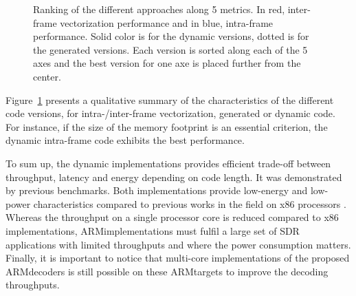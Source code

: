 \begin{figure}
  \centering
  \caption{\label{fig:eval_polar_sc_colgate}Ranking of the different approaches
    along 5 metrics. In red, inter-frame vectorization performance and in blue,
    intra-frame performance. Solid color is for the dynamic versions, dotted is
    for the generated versions. Each version is sorted along each of the 5 axes
    and the best version for one axe is placed further from the center.}
\end{figure}

Figure~\ref{fig:eval_polar_sc_colgate} presents a qualitative summary of the
characteristics of the different code versions, for intra-/inter-frame
vectorization, generated or dynamic code. For instance, if the size of
the memory footprint is an essential criterion, the dynamic intra-frame
code exhibits the best performance.

To sum up, the dynamic implementations provides efficient trade-off between
throughput, latency and energy depending on code length. It was demonstrated by
previous benchmarks. Both implementations provide low-energy and low-power
characteristics compared to previous works in the field on x86 processors
\cite{Sarkis2014,Giard2014,Sarkis2014a,LeGal2014,LeGal2015a,Cassagne2015c}.
Whereas the throughput on a single processor core is reduced compared to x86
implementations, ARM\R implementations must fulfil a large set of SDR
applications with limited throughputs and where the power consumption matters.
Finally, it is important to notice that multi-core implementations of the
proposed ARM\R decoders is still possible on these ARM\R targets to improve the
decoding throughputs.

